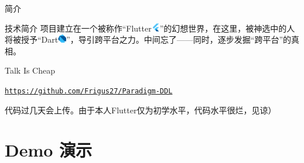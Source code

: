 \documentclass{beamer}
\begin{document}
    \begin{frame}{简介}
        \vfill
        \begin{block}{技术简介}
            项目建立在一个被称作“Flutter\includegraphics[width=1em]{ic_launcher.png}”的幻想世界，在这里，被神选中的人将被授予“Dart\includegraphics[width=1em]{dart.png}”，导引跨平台之力。中间忘了——同时，逐步发掘“跨平台”的真相。
        \end{block}
        \vfill
        \begin{block}{Talk Is Cheap}
            
            \texttt{\href{https://github.com/Frigus27/Paradigm-DDL}{https://github.com/Frigus27/Paradigm-DDL}}
            {\par \scriptsize *代码过几天会上传。由于本人Flutter仅为初学水平，代码水平很烂，见谅）}
        \end{block}
        \vfill
    \end{frame}

    \section{Demo 演示}
\end{document}
